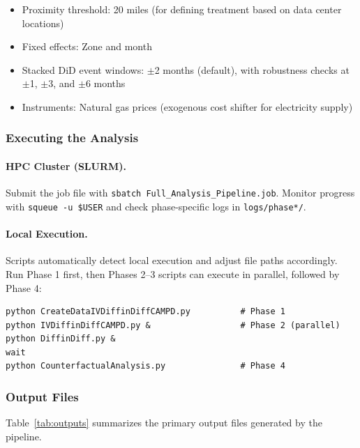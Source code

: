\documentclass[sigconf]{acmart}
\begin{document}
\begin{itemize}[noitemsep,topsep=0pt]
    \item Proximity threshold: 20 miles (for defining treatment based on data center locations)
    \item Fixed effects: Zone and month
    \item Stacked DiD event windows: $\pm$2 months (default), with robustness checks at $\pm$1, $\pm$3, and $\pm$6 months
    \item Instruments: Natural gas prices (exogenous cost shifter for electricity supply)
\end{itemize}

\subsubsection{Executing the Analysis}
\label{appendix:execution}

\paragraph{HPC Cluster (SLURM).} Submit the job file with \texttt{sbatch Full\_Analysis\_Pipeline.job}. Monitor progress with \texttt{squeue -u \$USER} and check phase-specific logs in \texttt{logs/phase*/}.

\paragraph{Local Execution.} Scripts automatically detect local execution and adjust file paths accordingly. Run Phase 1 first, then Phases 2--3 scripts can execute in parallel, followed by Phase 4:
\begin{verbatim}
python CreateDataIVDiffinDiffCAMPD.py          # Phase 1
python IVDiffinDiffCAMPD.py &                  # Phase 2 (parallel)
python DiffinDiff.py &
wait
python CounterfactualAnalysis.py               # Phase 4
\end{verbatim}

\subsubsection{Output Files}
\label{appendix:outputs}

Table~\ref{tab:outputs} summarizes the primary output files generated by the pipeline.
\end{document}
